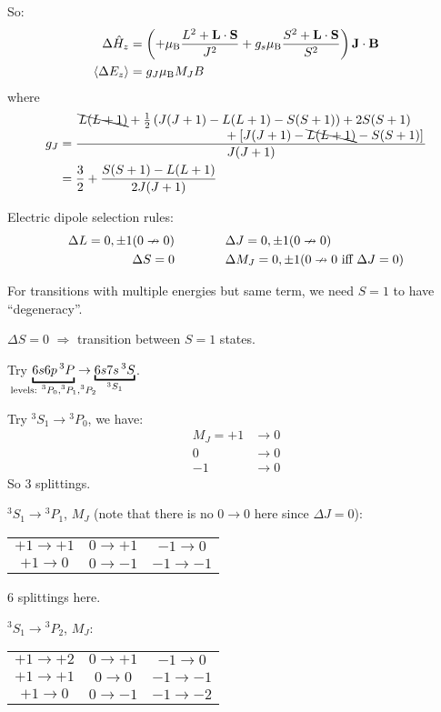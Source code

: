 \begin{parts}
	So:
	\begin{align*}
		\Delta\hat{H}_z &= \left(+\mu_\mathrm{B}\frac{L^2 + \mathbf{L}\cdot\mathbf{S}}{J^2} + g_s\mu_\mathrm{B}\frac{S^2 + \mathbf{L}\cdot\mathbf{S}}{S^2}\right) \mathbf{J}\cdot\mathbf{B} \\
		\left\langle{}\Delta E_z{}\right\rangle &= g_J \mu_\mathrm{B} M_J B
	\end{align*}
	where
	\begin{align*}
		g_J &= \frac{\splitfrac{\bcancel{L(L+1)} + \frac{1}{2}\rbracket{J(J+1)-L(L+1)-S(S+1)} + 2S(S+1)}{+ \sbracket{J(J+1)-\bcancel{L(L+1)}-S(S+1)}}}{J(J+1)} \\
		&= \frac{3}{2} + \frac{S(S+1)-L(L+1)}{2J(J+1)}
	\end{align*}
	
	Electric dipole selection rules:
	\begin{align*}
		\Delta L=0, \pm 1 (0 \nrightarrow 0) &\qquad\qquad \Delta J=0, \pm 1 (0 \nrightarrow 0) \\
		\Delta S=0 &\qquad\qquad \Delta M_J=0, \pm 1 (0 \nrightarrow 0 \textnormal{ iff } \Delta J=0)
	\end{align*}
	
	For transitions with multiple energies but same term, we need $S=1$ to have ``degeneracy''.
	
	$\Delta S=0$ $\Rightarrow$ transition between $S=1$ states.
	
	Try $\underbracket{6s6p\,{}^3 P}_{\mathclap{\textnormal{levels: }{}^3 P_0, {}^3 P_1, {}^3 P_2}} \to \underbracket{6s7s\,{}^3 S}_{{}^3 S_1}$.
	
	Try ${}^3 S_1 \to {}^3 P_0$, we have:
	\begin{align*}
		M_J = +1 &\to 0 \\
		0 &\to 0 \\
		-1 &\to 0
	\end{align*}
	So 3 splittings.
	
	${}^3 S_1 \to {}^3 P_1$, $M_J$ (note that there is no $0 \to 0$ here since $\Delta J=0$):
	
	\begin{tabular}{c c c}
		$+1 \to +1$ & $0 \to +1$ & $-1 \to 0$ \\
		$+1 \to 0$ & $0 \to -1$ & $-1 \to -1$
	\end{tabular}
	
	6 splittings here.
	
	${}^3 S_1 \to {}^3 P_2$, $M_J$:
	
	\begin{tabular}{c c c}
		$+1 \to +2$ & $0 \to +1$ & $-1 \to 0$ \\
		$+1 \to +1$ & $0 \to 0$ & $-1 \to -1$ \\
		$+1 \to 0$ & $0 \to -1$ & $-1 \to -2$
	\end{tabular}
	

\end{parts}
